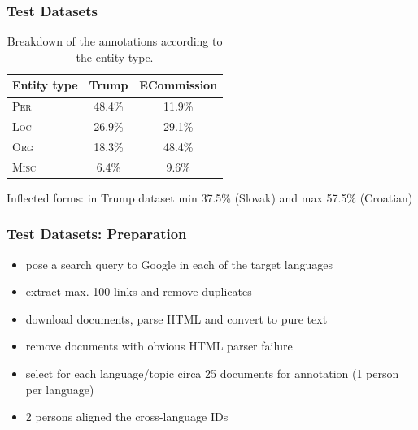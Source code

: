 \documentclass{beamer}
\begin{document}
\begin{frame}[fragile]
 \frametitle{Test Datasets}

\begin{table}
  \begin{center}
    \begin{footnotesize}
      \begin{tabular}{lcc}
        \toprule 
        Entity type & {\textbf{{\sc Trump}}} & {\textbf{{\sc ECommission}}} \\
        \midrule
	\textsc{Per} & 48.4\% & 11.9\% \\
	\textsc{Loc} & 26.9\% & 29.1\% \\
	\textsc{Org} & 18.3\% & 48.4\% \\
	\textsc{Misc} & \phantom{0}6.4\% & \phantom{0}9.6\% \\
        \bottomrule
      \end{tabular}
    \end{footnotesize}
  \end{center}
  \caption{Breakdown of the annotations according to the entity type.}
\end{table}

Inflected forms: in {\sc Trump} dataset min {\color{red}37.5\%} (Slovak) and max {\color{red}57.5\%} (Croatian)

\end{frame}

\begin{frame}[fragile]
 \frametitle{Test Datasets: Preparation}

\begin{itemize}

\item pose a search query to Google in each of the target languages

\item extract max. 100 links and remove duplicates

\item download documents, parse HTML and convert to pure text

\item remove documents with obvious HTML parser failure

\item select for each language/topic circa 25 documents for annotation (1 person per language)

\item 2 persons aligned the cross-language IDs

\end{itemize}

\end{frame}
\end{document}
